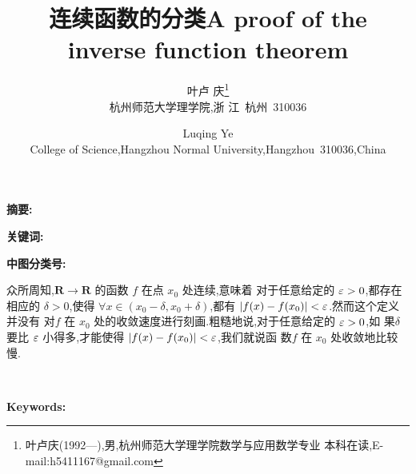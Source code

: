 \documentclass[twoside,11pt]{article}
\begin{document}
\title{\huge{\textbf{连续函数的分类}}} \author{\small{叶卢
    庆\footnote{叶卢庆(1992---),男,杭州师范大学理学院数学与应用数学专业
      本科在读,E-mail:h5411167@gmail.com}}\\{\small{杭州师范大学理学院,浙
      江~杭州~310036}}} \date{}
\maketitle
  


\textbf{\small{摘要}:}   \smallskip

\textbf{\small{关键词}:} \smallskip

\textbf{\small{中图分类号}:}
  
\vspace{30pt} %
  
众所周知,$\mathbf{R}\to \mathbf{R}$ 的函数 $f$ 在点 $x_0$ 处连续,意味着
对于任意给定的 $\varepsilon>0$,都存在相应的 $\delta>0$,使得 $\forall x\in
(x_0-\delta,x_0+\delta)$,都有 $|f(x)-f(x_0)|<\varepsilon$.然而这个定义并没有
对$f$ 在 $x_0$ 处的收敛速度进行刻画.粗糙地说,对于任意给定的 $\varepsilon>0$,如
果$\delta$ 要比 $\varepsilon$ 小得多,才能使得 $|f(x)-f(x_0)|<\varepsilon$,我们就说函
数$f$ 在 $x_0$ 处收敛地比较慢.
%
\begin{thebibliography}{}


%    

\end{thebibliography}
\centering\title{{\textbf{{A proof of the inverse function theorem}}}}
\bigskip\\\author{\small{Luqing Ye}\\{\small{College of
      Science,Hangzhou Normal University,Hangzhou~310036,China}}}
\maketitle
\begin{abstract}

\end{abstract}
\textbf{\small{Keywords}:}
\end{document}
